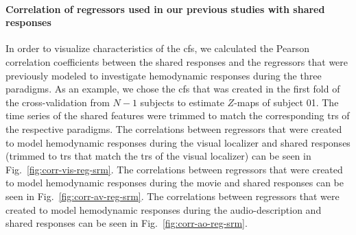 \paragraph{Correlation of regressors used in our previous studies with shared
responses}






In order to visualize characteristics of the \ac{cfs}, we calculated the Pearson
correlation coefficients between the shared responses and the regressors that
were previously modeled \citep[cf.][]{sengupta2016extension,
haeusler2022processing} to investigate hemodynamic responses during the three
paradigms.
%
As an example, we chose the \ac{cfs} that was created in the first fold of the
cross-validation from $N-1$ subjects to estimate $Z$-maps of subject 01.
%
The time series of the shared features were trimmed to match the corresponding
\acp{tr} of the respective paradigms.
%
The correlations between regressors that were created to model hemodynamic
responses during the visual localizer and shared responses (trimmed to \acp{tr}
that match the \acp{tr} of the visual localizer) can be seen in
Fig.~\ref{fig:corr-vis-reg-srm}.
%
The correlations between regressors that were created to model hemodynamic
responses during the movie \citep[cf. Table 3 in][]{haeusler2022processing} and
shared responses can be seen in Fig.~\ref{fig:corr-av-reg-srm}.
%
The correlations between regressors that were created to model hemodynamic
responses during the audio-description \citep[cf. Table 3
in][]{haeusler2022processing} and shared responses can be seen in
Fig.~\ref{fig:corr-ao-reg-srm}.




